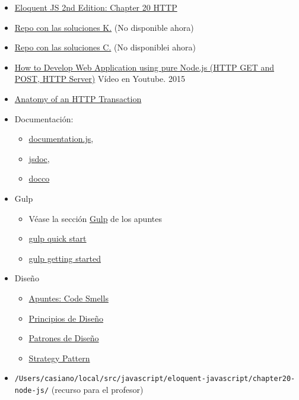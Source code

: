 \documentclass[]{article}
\providecommand{\tightlist}{%
  \setlength{\itemsep}{0pt}\setlength{\parskip}{0pt}}
\begin{document}
\begin{itemize}
\tightlist
\item
  \href{https://eloquentjavascript.net/2nd_edition/20_node.html}{Eloquent
  JS 2nd Edition: Chapter 20 HTTP}
\item
  \href{https://github.com/ULL-ESIT-MII-CA-1718/nodejs-KevMCh}{Repo con
  las soluciones K.} (No disponible ahora)
\item
  \href{https://github.com/ULL-ESIT-MII-CA-1718/ejs-chapter20-node-js}{Repo
  con las soluciones C.} (No disponiblei ahora)
\item
  \href{https://youtu.be/nuw48-u3Yrg}{How to Develop Web Application
  using pure Node.js (HTTP GET and POST, HTTP Server)} Vídeo en Youtube.
  2015
\item
  \href{https://nodejs.org/en/docs/guides/anatomy-of-an-http-transaction/}{Anatomy
  of an HTTP Transaction}
\item
  Documentación:

  \begin{itemize}
  \tightlist
  \item
    \href{https://documentation.js.org/}{documentation.js},
  \item
    \href{https://www.npmjs.com/package/jsdoc}{jsdoc},
  \item
    \href{https://jashkenas.github.io/docco\%60}{docco}
  \end{itemize}
\item
  Gulp

  \begin{itemize}
  \tightlist
  \item
    Véase la sección
    \href{https://casianorodriguezleon.gitbooks.io/ull-esit-1617/apuntes/gulp/}{Gulp}
    de los apuntes
  \item
    \href{https://gulpjs.com/docs/en/getting-started/quick-start}{gulp
    quick start}
  \item
    \href{https://gulpjs.org/getting-started.html}{gulp getting started}
  \end{itemize}
\item
  Diseño

  \begin{itemize}
  \tightlist
  \item
    \href{https://casianorodriguezleon.gitbooks.io/ull-esit-1617/content/apuntes/patterns/codesmell.html}{Apuntes:
    Code Smells}
  \item
    \href{https://casianorodriguezleon.gitbooks.io/ull-esit-1617/content/apuntes/patterns/designprinciples.html}{Principios
    de Diseño}
  \item
    \href{https://casianorodriguezleon.gitbooks.io/ull-esit-1617/content/apuntes/patterns/}{Patrones
    de Diseño}
  \item
    \href{https://casianorodriguezleon.gitbooks.io/ull-esit-1617/content/apuntes/patterns/strategypattern.html}{Strategy
    Pattern}
  \end{itemize}
\item
  \texttt{/Users/casiano/local/src/javascript/eloquent-javascript/chapter20-node-js/}
  (recurso para el profesor)
\end{itemize}
\end{document}
